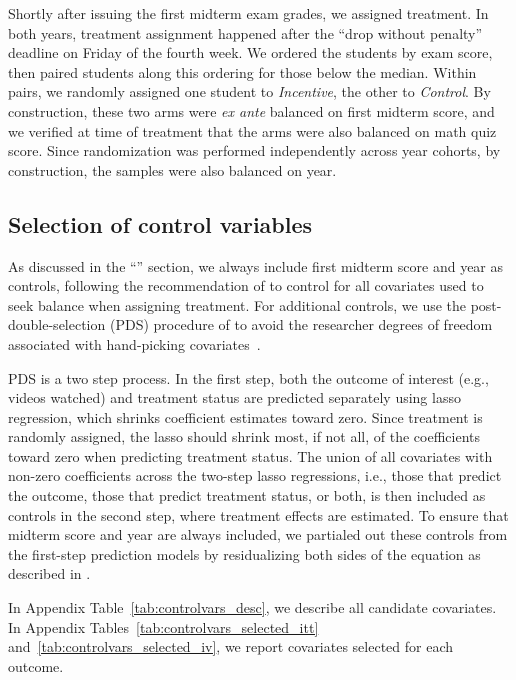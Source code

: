 Shortly after issuing the first midterm exam grades, we assigned treatment.
In both years, treatment assignment happened after the ``drop without penalty'' deadline on Friday of the fourth week.
We ordered the students by exam score, then paired students along this ordering for those below the median.
Within pairs, we randomly assigned one student to \textit{Incentive}, the other to \textit{Control}.
By construction, these two arms were \textit{ex ante} balanced on first midterm score, and we verified at time of treatment that the arms were also balanced on math quiz score.
Since randomization was performed independently across year cohorts, by construction, the samples were also balanced on year.

\subsection{Selection of control variables} \label{subsubsec:a_selection}

As discussed in the ``'' section, we always include first midterm score and year as controls, following the recommendation of \textcite{bm2009} to control for all covariates used to seek balance when assigning treatment.
For additional controls, we use the post-double-selection (PDS) procedure of \textcite{bch2014a} to avoid the researcher degrees of freedom associated with hand-picking covariates~\parencite{sns2011}.

PDS is a two step process.
In the first step, both the outcome of interest (e.g., videos watched) and treatment status are predicted separately using lasso regression, which shrinks coefficient estimates toward zero.
Since treatment is randomly assigned, the lasso should shrink most, if not all, of the coefficients toward zero when predicting treatment status.
The union of all covariates with non-zero coefficients across the two-step lasso regressions, i.e., those that predict the outcome, those that predict treatment status, or both, is then included as controls in the second step, where treatment effects are estimated.
To ensure that midterm score and year are always included, we partialed out these controls from the first-step prediction models by residualizing both sides of the equation as described in \textcite{bch2014b}.

In Appendix Table~\ref{tab:controlvars_desc}, we describe all candidate covariates.
In Appendix Tables~\ref{tab:controlvars_selected_itt} and~\ref{tab:controlvars_selected_iv}, we report covariates selected for each outcome.


